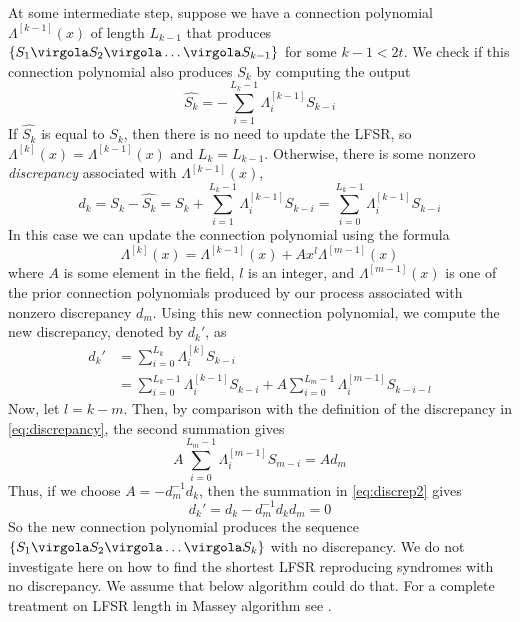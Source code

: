 At some intermediate step, suppose we have a connection polynomial \(\Lambda^{[k-1]}(x)\) of length \(L_{k-1}\) that produces \( \{S_1\virgola S_2\virgola \ldots \virgola S_{k-1} \}\) for some \(k-1 < 2t\). We check if this connection polynomial also produces \(S_k\) by computing the output
\begin{equation}
\hat{S_k} = - \sum_{i = 1}^{L_k-1} {\Lambda_i^{[k-1]} S_{k-i}}
\end{equation}
If \(\hat{S_k}\) is equal to \(S_k\), then there is no need to update the LFSR, so \(\Lambda^{[k]}(x)= \Lambda^{[k-1]}(x)\) and \(L_k=L_{k-1}\). Otherwise, there is some nonzero \emph{discrepancy} associated with \(\Lambda^{[k-1]}(x)\),
\begin{equation} \label{eq:discrepancy}
d_k = S_k - \hat{S_k} = S_k + \sum_{i = 1}^{L_k-1} {\Lambda_i^{[k-1]} S_{k-i}} =
\sum_{i = 0}^{L_k-1} {\Lambda_i^{[k-1]} S_{k-i}}
\end{equation}
In this case we can update the connection polynomial using the formula
\begin{equation}
\Lambda^{[k]}(x) = \Lambda^{[k-1]}(x) + A x^l \Lambda^{[m-1]}(x)
\end{equation}
where \(A\) is some element in the field, \(l\) is an integer, and \(\Lambda^{[m-1]}(x)\) is one of the prior connection polynomials produced by our process associated with nonzero discrepancy \(d_m\).
Using this new connection polynomial, we compute the new discrepancy, denoted by \({d_k}'\), as
\begin{align}
{d_k}' &= \sum_{i = 0}^{L_k} {\Lambda_i^{[k]} S_{k-i}}\\
     &= \sum_{i = 0}^{L_k-1} {\Lambda_i^{[k-1]} S_{k-i}} + A \sum_{i = 0}^{L_m-1} {\Lambda_i^{[m-1]} S_{k-i-l}} \label{eq:discrep2}
\end{align}
Now, let \(l=k-m\). Then, by comparison with the definition of the discrepancy in \eqref{eq:discrepancy}, the second summation gives
\begin{equation}
A \sum_{i = 0}^{L_m-1} {\Lambda_i^{[m-1]} S_{m-i}} = A d_m
\end{equation}
Thus, if we choose \(A=-d_m^{-1}d_k\), then the summation in \eqref{eq:discrep2} gives
\begin{equation}
{d_k}' = d_k -d_m^{-1} d_k d_m = 0
\end{equation}
So the new connection polynomial produces the sequence \( \{S_1\virgola S_2\virgola \ldots \virgola S_{k} \}\) with no discrepancy. We do not investigate here on how to find the shortest LFSR reproducing syndromes with no discrepancy. We assume that below algorithm could do that. For a complete treatment on LFSR length in Massey algorithm see \cite{b:moon}.

